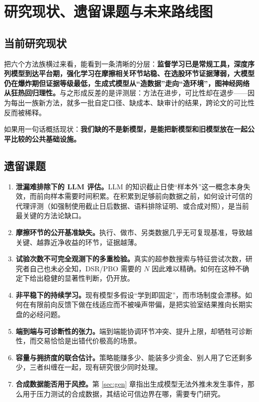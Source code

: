 \section{研究现状、遗留课题与未来路线图}\label{sec:future}

\subsection{当前研究现状}

把六个方法族横过来看，能看到一条清晰的分层：\textbf{监督学习已是常规工具，深度序列模型到达平台期，强化学习在摩擦相关环节站稳、在选股环节证据薄弱，大模型仍在爆炸期但证据等级最低，生成式模型从“造数据”走向“造环境”，图神经网络从狂热回归理性。}与之形成反差的是评测层：方法在进步，可比性却在退步——因为每出一族新方法，就多一批自定口径、缺成本、缺审计的结果，跨论文的可比性反而被稀释。

如果用一句话概括现状：\textbf{我们缺的不是新模型，是能把新模型和旧模型放在一起公平比较的公共基础设施。}

\subsection{遗留课题}

\begin{enumerate}
  \item \textbf{泄漏难排除下的 LLM 评估。}LLM 的知识截止日使“样本外”这一概念本身失效，而前向样本需要时间积累。在积累到足够前向数据之前，如何设计可信的代理评测（如强制使用截止日后数据、语料排除证明、或合成对照），是当前最关键的方法论缺口。
  \item \textbf{摩擦环节的公开基准缺失。}执行、做市、另类数据几乎无可复现基准，导致越关键、越靠近净收益的环节，证据越薄。
  \item \textbf{试验次数不可完全观测下的多重检验。}真实的超参数搜索与特征尝试次数，研究者自己也未必全知，DSR/PBO 需要的 $N$ 因此难以精确。如何在这种不确定下给出稳健的显著性判断，仍开放。
  \item \textbf{非平稳下的持续学习。}现有模型多假设“学到即固定”，而市场制度会漂移。如何在有限前向反馈下做在线适应而不被噪声带偏，是把实验室结果推向长期实盘的必经问题。
  \item \textbf{端到端与可诊断性的张力。}端到端能协调环节冲突、提升上限，却牺牲可诊断性，而交易恰恰是出错代价极高的场景。
  \item \textbf{容量与拥挤度的联合估计。}策略能赚多少、能装多少资金、别人用了它还剩多少，三者纠缠在一起，现有研究很少同时处理。
  \item \textbf{合成数据能否用于风控。}第 \ref{sec:gen} 章指出生成模型无法外推未发生事件，那么用于压力测试的合成数据，其结论可信边界在哪，需要专门研究。
\end{enumerate}

